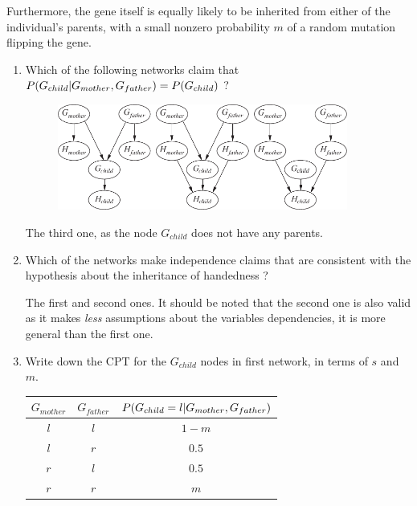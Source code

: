 \documentclass[11pt, a4paper]{article}
\begin{document}
Furthermore, the gene itself is equally likely to be inherited from either of the individual's parents, with a small nonzero probability $m$ of a random mutation flipping the gene.

\begin{enumerate}
    \item Which of the following networks claim that $P(G_{child} \vert G_{mother}, G_{father}) = P(G_{child})$ ?

    \begin{figure}[h]
        \centering
        \includegraphics[width=0.9\textwidth]{figures/e3_handedness.pdf}
    \end{figure}

    \begin{solution}
        The third one, as the node $G_{child}$ does not have any parents.
    \end{solution}

    \item Which of the networks make independence claims that are consistent with the hypothesis about the inheritance of handedness ?

    \begin{solution}
        The first and second ones. It should be noted that the second one is also valid as it makes \emph{less} assumptions about the variables dependencies, \ie{} it is more general than the first one.
    \end{solution}

    \item Write down the CPT for the $G_{child}$ nodes in first network, in terms of $s$ and $m$.

    \begin{solution}
        \begin{table}[h]
            \centering
            \begin{tabular}{cc|c}
                \toprule
                 $G_{mother}$ & $G_{father}$ & $P(G_{child} = l \vert G_{mother}, G_{father})$ \\
                 \midrule
                 $l$ & $l$ & $1 - m$ \\
                 $l$ & $r$ & $0.5$ \\
                 $r$ & $l$ & $0.5$ \\
                 $r$ & $r$ & $m$ \\
                \bottomrule
            \end{tabular}
        \end{table}
    \end{solution}


\end{enumerate}
\end{document}
